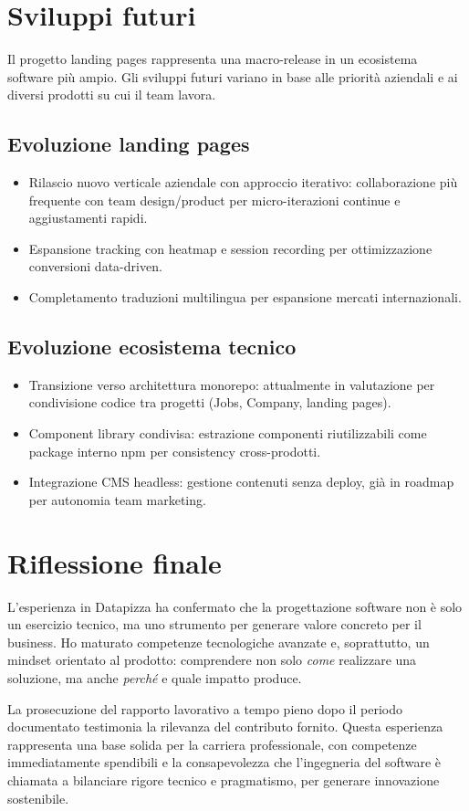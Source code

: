 \section{Sviluppi futuri}

Il progetto landing pages rappresenta una macro-release in un ecosistema software 
più ampio. Gli sviluppi futuri variano in base alle priorità aziendali e ai diversi 
prodotti su cui il team lavora.

\subsection{Evoluzione landing pages}
\begin{itemize}
  \item Rilascio nuovo verticale aziendale con approccio iterativo: collaborazione 
        più frequente con team design/product per micro-iterazioni continue e 
        aggiustamenti rapidi.
  \item Espansione tracking con heatmap e session recording per ottimizzazione 
        conversioni data-driven.
  \item Completamento traduzioni multilingua per espansione mercati internazionali.
\end{itemize}

\subsection{Evoluzione ecosistema tecnico}
\begin{itemize}
  \item Transizione verso architettura monorepo: attualmente in valutazione per 
        condivisione codice tra progetti (Jobs, Company, landing pages).
  \item Component library condivisa: estrazione componenti riutilizzabili come 
        package interno npm per consistency cross-prodotti.
  \item Integrazione CMS headless: gestione contenuti senza deploy, già in 
        roadmap per autonomia team marketing.
\end{itemize}

\section{Riflessione finale}
L'esperienza in Datapizza ha confermato che la progettazione software non è solo
un esercizio tecnico, ma uno strumento per generare valore concreto per il business.
Ho maturato competenze tecnologiche avanzate e, soprattutto, un mindset orientato al prodotto:
comprendere non solo \textit{come} realizzare una soluzione, ma anche \textit{perché}
e quale impatto produce.

La prosecuzione del rapporto lavorativo a tempo pieno dopo il periodo documentato
testimonia la rilevanza del contributo fornito. Questa esperienza rappresenta una base solida
per la carriera professionale, con competenze immediatamente spendibili e la consapevolezza
che l'ingegneria del software è chiamata a bilanciare rigore tecnico e pragmatismo,
per generare innovazione sostenibile.